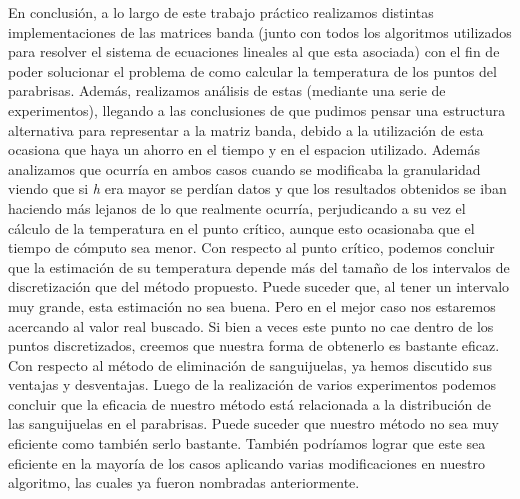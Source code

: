 \documentclass[10pt, a4paper]{article}
\begin{document}
En conclusi\'on, a lo largo de este trabajo pr\'actico realizamos distintas implementaciones de las matrices banda (junto con todos los algoritmos utilizados para resolver el sistema de ecuaciones lineales al que esta asociada) con el fin de poder solucionar el problema de como calcular la temperatura de los puntos del parabrisas. Adem\'as, realizamos an\'alisis de estas (mediante una serie de experimentos), llegando a las conclusiones de que pudimos pensar una estructura alternativa para representar a la matriz banda, debido a la utilizaci\'on de esta ocasiona que haya un ahorro en el tiempo y en el espacion utilizado. Adem\'as analizamos que ocurr\'ia en ambos casos cuando se modificaba la granularidad viendo que si \textit{h} era mayor se perd\'ian datos y que los resultados obtenidos se iban haciendo m\'as lejanos de lo que realmente ocurr\'ia, perjudicando a su vez el c\'alculo de la temperatura en el punto cr\'itico, aunque esto ocasionaba que el tiempo de c\'omputo sea menor. Con respecto al punto cr\'itico, podemos concluir que la estimaci\'on de su temperatura depende m\'as del tamaño de los intervalos de discretizaci\'on que del m\'etodo propuesto. Puede suceder que, al tener un intervalo muy grande, esta estimaci\'on no sea buena. Pero en el mejor caso nos estaremos acercando al valor real buscado. Si bien a veces este punto no cae dentro de los puntos discretizados, creemos que nuestra forma de obtenerlo es bastante eficaz. Con respecto al m\'etodo de eliminaci\'on de sanguijuelas, ya hemos discutido sus ventajas y desventajas. Luego de la realizaci\'on de varios experimentos podemos concluir que la eficacia de nuestro m\'etodo est\'a relacionada a la distribuci\'on de las sanguijuelas en el parabrisas. Puede suceder que nuestro m\'etodo no sea muy eficiente como tambi\'en serlo bastante. Tambi\'en podr\'iamos lograr que este sea eficiente en la mayor\'ia de los casos aplicando varias modificaciones en nuestro algoritmo, las cuales ya fueron nombradas anteriormente.

\newpage
\end{document}
